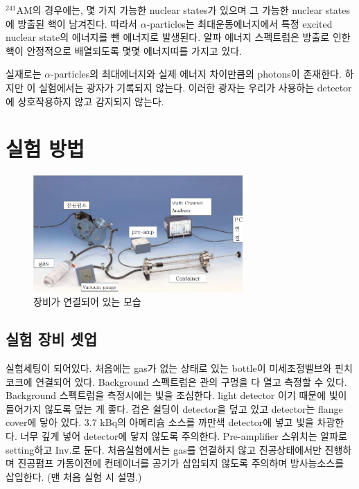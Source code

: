\documentclass[a4paper, 10pt, nanum]{CSUniSchoolLabReport}
\begin{document}
	$^{241}\textrm{AM}$의 경우에는, 몇 가지 가능한 nuclear states가 있으며 그 가능한 nuclear states에 방출된 핵이 남겨진다. 따라서 $\alpha$-particles는 최대운동에너지에서 특정 excited nuclear state의 에너지를 뺀 에너지로 발생된다. 알파 에너지 스펙트럼은 방출로 인한 핵이 안정적으로 배열되도록 몇몇 에너지띠를 가지고 있다.

	실재로는 $\alpha$-particles의 최대에너지와 실제 에너지 차이만큼의 photons이 존재한다. 하지만 이 실험에서는 광자가 기록되지 않는다. 이러한 광자는 우리가 사용하는 detector에 상호작용하지 않고 감지되지 않는다.


\section{실험 방법}

	\begin{figure}[htb!]
		\centering
		\includegraphics[width=8cm]{fig1.pdf}
		\caption{장비가 연결되어 있는 모습}
		\label{fig:1}
	\end{figure}

\subsection{실험 장비 셋업}

	실험세팅이 되어있다. 처음에는 gas가 없는 상태로 있는 bottle이 미세조정벨브와 핀치코크에 연결되어 있다. Background 스펙트럼은 관의 구멍을 다 열고 측정할 수 있다. Background 스펙트럼을 측정시에는 빛을 조심한다. light detector 이기 때문에 빛이 들어가지 않도록 덮는 게 좋다. 검은 쉴딩이 detector을 덮고 있고 detector는 flange cover에 닿아 있다. 3.7 kBq의 아메리슘 소스를 까만색 detector에 넣고 빛을 차광한다. 너무 깊게 넣어 detector에 닿지 않도록 주의한다. Pre-amplifier 스위치는 알파로 setting하고 Inv.로 둔다. 처음실험에서는 gas를 연결하지 않고 진공상태에서만 진행하며 진공펌프 가동이전에 컨테이너를 공기가 삽입되지 않도록 주의하며 방사능소스를 삽입한다. (맨 처음 실험 시 설명.)
\end{document}

